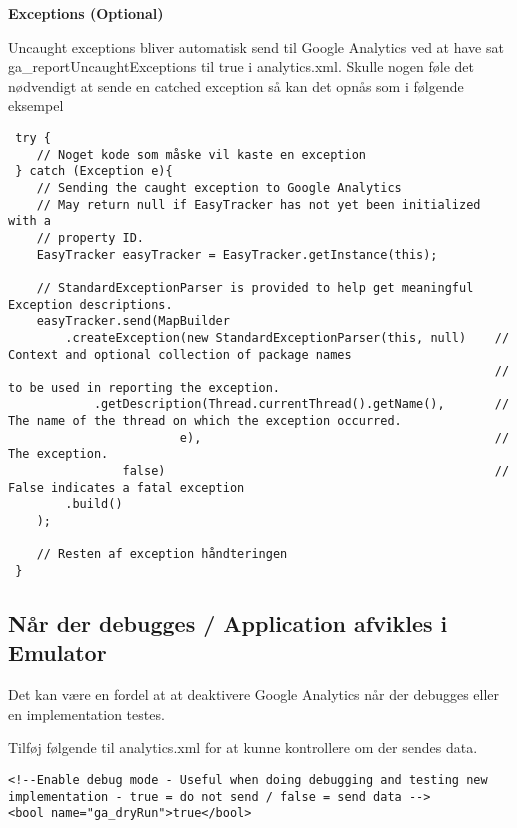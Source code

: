 \textbf{Exceptions (Optional)}

Uncaught exceptions bliver automatisk send til Google Analytics ved at have sat ga_reportUncaughtExceptions til true i analytics.xml.
Skulle nogen føle det nødvendigt at sende en catched exception så kan det opnås som i følgende eksempel

\begin{lstlisting}
 try {
	// Noget kode som måske vil kaste en exception
 } catch (Exception e){
	// Sending the caught exception to Google Analytics
	// May return null if EasyTracker has not yet been initialized with a
	// property ID.
	EasyTracker easyTracker = EasyTracker.getInstance(this);

	// StandardExceptionParser is provided to help get meaningful Exception descriptions.
	easyTracker.send(MapBuilder
		.createException(new StandardExceptionParser(this, null)    // Context and optional collection of package names
																	// to be used in reporting the exception.
			.getDescription(Thread.currentThread().getName(),       // The name of the thread on which the exception occurred.
						e),                                         // The exception.
				false)                                              // False indicates a fatal exception
		.build()
	);

	// Resten af exception håndteringen
 }
\end{lstlisting}

\subsection{Når der debugges / Application afvikles i Emulator}
Det kan være en fordel at at deaktivere Google Analytics når der debugges eller en implementation testes.

Tilføj følgende til analytics.xml for at kunne kontrollere om der sendes data.

\begin{lstlisting}
<!--Enable debug mode - Useful when doing debugging and testing new implementation - true = do not send / false = send data -->
<bool name="ga_dryRun">true</bool>
\end{lstlisting}

